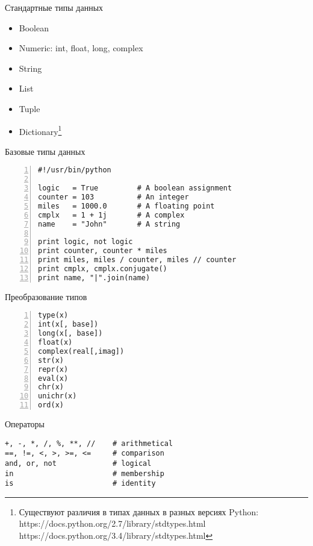 \documentclass[hyperref={pdftex,unicode}]{beamer}
\begin{document}
\begin{frame}{Стандартные типы данных}
  \begin{itemize}
    \item Boolean
    \item Numeric: int, float, long, complex
    \item String
    \item List
    \item Tuple
    \item Dictionary\footnote[frame]{
        Существуют различия в типах данных в разных версиях Python: \\
        https://docs.python.org/2.7/library/stdtypes.html \\
        https://docs.python.org/3.4/library/stdtypes.html}
  \end{itemize}
\end{frame}

\begin{frame}[fragile]{Базовые типы данных}
  \begin{lstlisting}[numbers=left]
#!/usr/bin/python

logic   = True         # A boolean assignment
counter = 103          # An integer 
miles   = 1000.0       # A floating point
cmplx   = 1 + 1j       # A complex 
name    = "John"       # A string

print logic, not logic
print counter, counter * miles
print miles, miles / counter, miles // counter
print cmplx, cmplx.conjugate()
print name, "|".join(name)
\end{lstlisting}
\end{frame}

\begin{frame}[fragile]{Преобразование типов}
  \begin{lstlisting}[numbers=left]
type(x)
int(x[, base])
long(x[, base])
float(x)
complex(real[,imag])
str(x)
repr(x)
eval(x)
chr(x)
unichr(x)
ord(x)
\end{lstlisting}
\end{frame}

\begin{frame}[fragile]{Операторы}
\begin{lstlisting}
+, -, *, /, %, **, //    # arithmetical
==, !=, <, >, >=, <=     # comparison
and, or, not             # logical
in                       # membership
is                       # identity
\end{lstlisting}
\end{frame}
\end{document}
